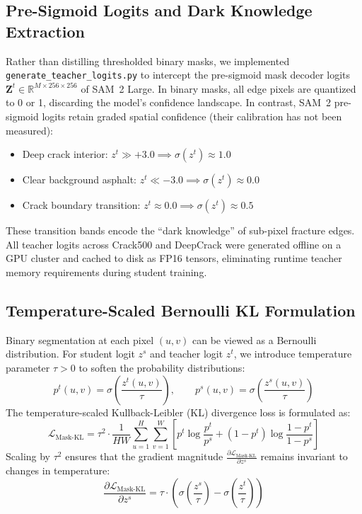 \documentclass[11pt,a4paper]{article}
\begin{document}
\subsection{Pre-Sigmoid Logits and Dark Knowledge Extraction}
Rather than distilling thresholded binary masks, we implemented \texttt{generate\_teacher\_logits.py} to intercept the pre-sigmoid mask decoder logits $\mathbf{Z}^t \in \mathbb{R}^{M \times 256 \times 256}$ of SAM~2 Large. 
In binary masks, all edge pixels are quantized to 0 or 1, discarding the model's confidence landscape. 
In contrast, SAM~2 pre-sigmoid logits retain graded spatial confidence (their calibration has not been measured):
\begin{itemize}[leftmargin=1.5em]
  \item Deep crack interior: $z^t \gg +3.0 \implies \sigma(z^t) \approx 1.0$
  \item Clear background asphalt: $z^t \ll -3.0 \implies \sigma(z^t) \approx 0.0$
  \item Crack boundary transition: $z^t \approx 0.0 \implies \sigma(z^t) \approx 0.5$
\end{itemize}
These transition bands encode the ``dark knowledge'' of sub-pixel fracture edges. 
All teacher logits across Crack500 and DeepCrack were generated offline on a GPU cluster and cached to disk as FP16 tensors, eliminating runtime teacher memory requirements during student training.

\subsection{Temperature-Scaled Bernoulli KL Formulation}
Binary segmentation at each pixel $(u, v)$ can be viewed as a Bernoulli distribution. 
For student logit $z^s$ and teacher logit $z^t$, we introduce temperature parameter $\tau > 0$ to soften the probability distributions:
\begin{equation}
  p^t(u, v) = \sigma\left(\frac{z^t(u, v)}{\tau}\right), \qquad p^s(u, v) = \sigma\left(\frac{z^s(u, v)}{\tau}\right)
\end{equation}
The temperature-scaled Kullback-Leibler (KL) divergence loss is formulated as:
\begin{equation}
  \mathcal{L}_{\text{Mask-KL}} = \tau^2 \cdot \frac{1}{HW} \sum_{u=1}^H \sum_{v=1}^W \left[ p^t \log \frac{p^t}{p^s} + (1 - p^t) \log \frac{1 - p^t}{1 - p^s} \right]
\end{equation}
Scaling by $\tau^2$ ensures that the gradient magnitude $\frac{\partial \mathcal{L}_{\text{Mask-KL}}}{\partial z^s}$ remains invariant to changes in temperature:
\begin{equation}
  \frac{\partial \mathcal{L}_{\text{Mask-KL}}}{\partial z^s} = \tau \cdot \left( \sigma\left(\frac{z^s}{\tau}\right) - \sigma\left(\frac{z^t}{\tau}\right) \right)
\end{equation}
\end{document}

